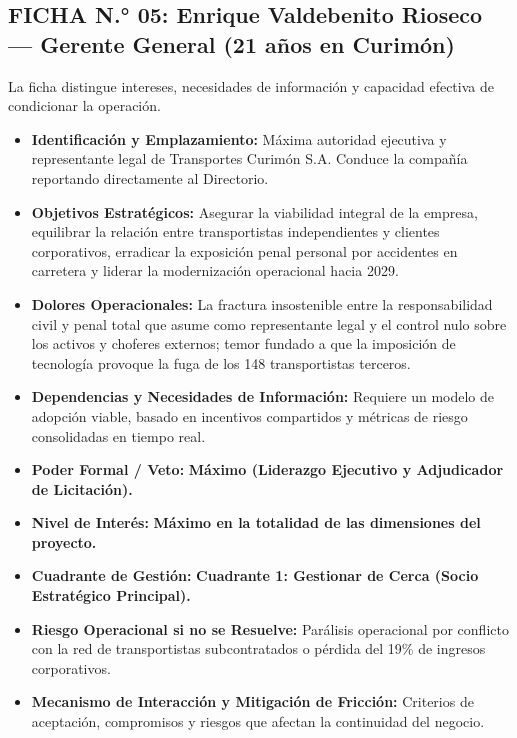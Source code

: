 \subsection*{FICHA N.° 05: Enrique Valdebenito Rioseco — Gerente General (21 años en Curimón)}
La ficha distingue intereses, necesidades de información y capacidad efectiva de condicionar la operación.
\begin{itemize}
\item \textbf{Identificación y Emplazamiento:} Máxima autoridad ejecutiva y representante legal de Transportes Curimón S.A. Conduce la compañía reportando directamente al Directorio.
\item \textbf{Objetivos Estratégicos:} Asegurar la viabilidad integral de la empresa, equilibrar la relación entre transportistas independientes y clientes corporativos, erradicar la exposición penal personal por accidentes en carretera y liderar la modernización operacional hacia 2029.
\item \textbf{Dolores Operacionales:} La fractura insostenible entre la responsabilidad civil y penal total que asume como representante legal y el control nulo sobre los activos y choferes externos; temor fundado a que la imposición de tecnología provoque la fuga de los 148 transportistas terceros.
\item \textbf{Dependencias y Necesidades de Información:} Requiere un modelo de adopción viable, basado en incentivos compartidos y métricas de riesgo consolidadas en tiempo real.
\item \textbf{Poder Formal / Veto:} \textbf{Máximo (Liderazgo Ejecutivo y Adjudicador de Licitación).}
\item \textbf{Nivel de Interés:} \textbf{Máximo en la totalidad de las dimensiones del proyecto.}
\item \textbf{Cuadrante de Gestión:} \textbf{Cuadrante 1: Gestionar de Cerca (Socio Estratégico Principal).}
\item \textbf{Riesgo Operacional si no se Resuelve:} Parálisis operacional por conflicto con la red de transportistas subcontratados o pérdida del 19\% de ingresos corporativos.
\item \textbf{Mecanismo de Interacción y Mitigación de Fricción:} Criterios de aceptación, compromisos y riesgos que afectan la continuidad del negocio.
\end{itemize}
